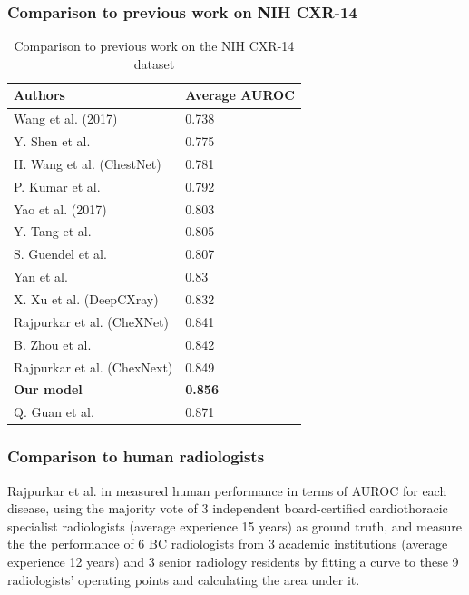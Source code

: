 \documentclass[8pt]{beamer}
\begin{document}
          \begin{frame}
            \frametitle{Comparison to previous work on NIH CXR-14}
            \begin{table}[]
              \centering
              \begin{tabular}{ll}
                \hline
                \textbf{Authors}            & \textbf{Average AUROC} \\ \hline
                Wang et al. (2017)          & 0.738                  \\ \hline
                Y. Shen et al.              & 0.775                  \\ \hline
                H. Wang et al. (ChestNet)   & 0.781                  \\ \hline
                P. Kumar et al.             & 0.792                  \\ \hline
                Yao et al. (2017)           & 0.803                  \\ \hline
                Y. Tang et al.              & 0.805                  \\ \hline
                S. Guendel et al.           & 0.807                  \\ \hline
                Yan et al.                  & 0.83                   \\ \hline
                X. Xu et al. (DeepCXray)    & 0.832                  \\ \hline
                Rajpurkar et al. (CheXNet)  & 0.841                  \\ \hline
                B. Zhou et al.              & 0.842                  \\ \hline
                Rajpurkar et al. (ChexNext) & 0.849                  \\ \hline
                \textbf{Our model}          & \textbf{0.856}         \\ \hline
                Q. Guan et al.              & 0.871                  \\ \hline
              \end{tabular}
              \caption{Comparison to previous work on the NIH CXR-14 dataset}
              \label{tab:nih_previous}
            \end{table}

          \end{frame}

\begin{frame}
  \frametitle{Comparison to human radiologists} Rajpurkar et al. in
  \cite{Rajpurkar2018a} measured human performance in terms of AUROC for each
  disease, using the majority vote of 3 independent board-certified
  cardiothoracic specialist radiologists (average experience 15 years) as ground
  truth, and measure the the performance of 6 BC radiologists from 3 academic
  institutions (average experience 12 years) and 3 senior radiology residents by
  fitting a curve to these 9 radiologists' operating points and calculating the
  area under it.
\end{frame}
\end{document}
